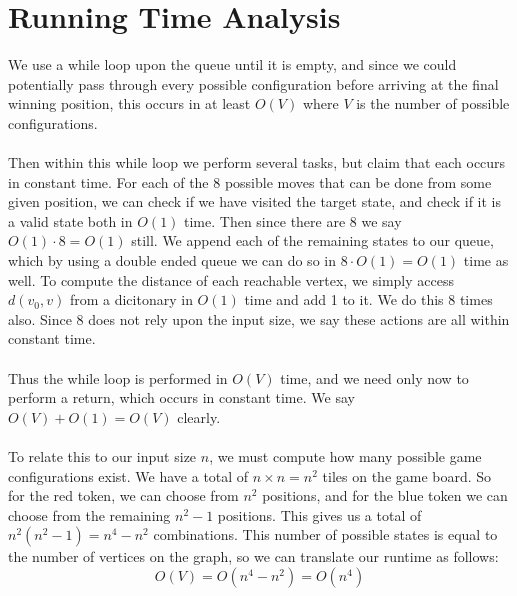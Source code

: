 \documentclass{article}
\theoremstyle{definition}
\begin{document}
\section{Running Time Analysis}
    We use a while loop upon the queue until it is empty, and since we could potentially pass through every possible configuration
    before arriving at the final winning position, this occurs in at least $O(V)$ where $V$ is the number of possible configurations.\\\\
    Then within this while loop we perform several tasks, but claim that each occurs in constant time. For each of the 8 possible moves
    that can be done from some given position, we can check if we have visited the target state, and check if it is a valid state both
    in $O(1)$ time. Then since there are 8 we say $O(1) \cdot 8 = O(1)$ still. We append each of the remaining states to our queue,
    which by using a double ended queue we can do so in $8 \cdot O(1) = O(1)$ time as well. To compute the distance of each reachable vertex,
    we simply access $d(v_0,v)$ from a dicitonary in $O(1)$ time and add 1 to it. We do this 8 times also. Since 8 does not rely upon the input size,
    we say these actions are all within constant time.\\\\
    Thus the while loop is performed in $O(V)$ time, and we need only now to perform a return, which occurs in constant time.
    We say $O(V) + O(1) = O(V)$ clearly.\\\\
    To relate this to our input size $n$, we must compute how many possible game configurations exist. We have a total of $n \times n = n^2$
    tiles on the game board. So for the red token, we can choose from $n^2$ positions, and for the blue token we can choose from the remaining $n^2 - 1$
    positions. This gives us a total of $n^2(n^2 - 1) = n^4 - n^2$ combinations. This number of possible states is equal to the number of vertices on the graph,
    so we can translate our runtime as follows:
    \[
        O(V) = O(n^4 - n^2) = O(n^4)
    \]
\end{document}
